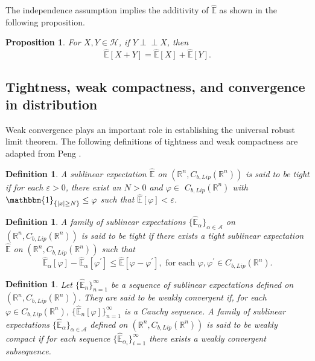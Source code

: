 \documentclass[a4paper,oneside,10pt]{article}%
\newtheorem{definition}[theorem]{Definition}
\newtheorem{proposition}[theorem]{Proposition}
\numberwithin{equation}{section}
\begin{document}
The independence assumption implies the additivity of $\mathbb{\hat{E}}$ as
shown in the following proposition.

\begin{proposition}
\label{Y independent X}For $X,Y \in \mathcal{H}$, if $Y\perp \! \! \! \perp X$,
then
\[
\mathbb{\hat{E}}[X+Y] =\mathbb{\hat{E}}[X] +\mathbb{\hat{E}}[Y].
\]

\end{proposition}

\subsection{Tightness, weak compactness, and convergence in distribution}

Weak convergence plays an important role in establishing the universal robust
limit theorem. The following definitions of tightness and weak compactness are
adapted from Peng \cite[Definitions 7 and 8]{P2010_CLT}.

\begin{definition}
\label{def_2.7} A sublinear expectation $\mathbb{\hat{E}}$ on $(\mathbb{R}%
^{n},C_{b,Lip}(\mathbb{R}^{n}))$ is said to be tight if for each
$\varepsilon>0$, there exist an $N>0$ and $\varphi \in$ $C_{b,Lip}%
(\mathbb{R}^{n})$ with $\mathbbm{1}_{\{|x|\geq N\}}\leq \varphi$ such that
$\mathbb{\hat{E}}[\varphi]<\varepsilon$.
\end{definition}

\begin{definition}
\label{def_2.8} A family of sublinear expectations $\{ \mathbb{\hat{E}%
}_{\alpha}\}_{\alpha \in \mathcal{A}}$ on $(\mathbb{R}^{n},C_{b,Lip}%
(\mathbb{R}^{n}))$ is said to be tight if there exists a tight sublinear
expectation $\mathbb{\hat{E}}$ on $(\mathbb{R}^{n},C_{b,Lip}(\mathbb{R}^{n}))$
such that
\[
\mathbb{\hat{E}}_{\alpha}[\varphi]-\mathbb{\hat{E}}_{\alpha}[\varphi^{\prime
}]\leq \mathbb{\hat{E}}[\varphi-\varphi^{\prime}],\text{ for each }
\varphi,\varphi^{\prime}\in C_{b,Lip}(\mathbb{R}^{n}).
\]

\end{definition}

\begin{definition}
Let $\{ \mathbb{\hat{E}}_{n}\}_{n=1}^{\infty}$ be a sequence of sublinear
expectations defined on $(\mathbb{R}^{n},C_{b,Lip}(\mathbb{R}^{n}))$. They are
said to be weakly convergent if, for each $\varphi \in C_{b,Lip}(\mathbb{R}%
^{n})$, $\{ \mathbb{\hat{E}}_{n}[\varphi]\}_{n=1}^{\infty}$ is a Cauchy
sequence. A family of sublinear expectations $\{ \mathbb{\hat{E}}_{\alpha
}\}_{\alpha \in \mathcal{A}}$ defined on $(\mathbb{R}^{n},C_{b,Lip}%
(\mathbb{R}^{n}))$ is said to be weakly compact if for each sequence $\{
\mathbb{\hat{E}}_{\alpha_{i}}\}_{i=1}^{\infty}$ there exists a weakly
convergent subsequence.
\end{definition}
\end{document}
